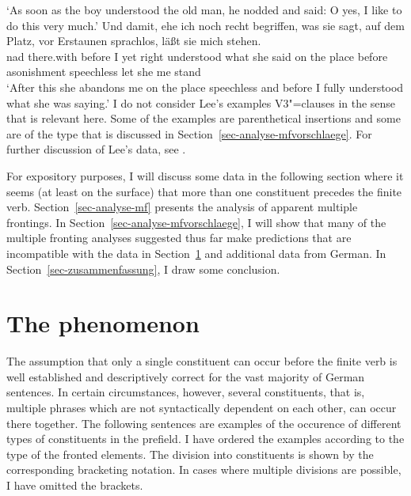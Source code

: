 \glt `As soon as the boy understood the old man, he nodded and said: O yes, I like to do this very much.'
\ex 
\gll Und damit, ehe ich noch recht begriffen, was sie sagt, auf dem Platz, vor Erstaunen sprachlos, läßt sie mich stehen.\footnotemark\\
     nad there.with before I yet right understood what she said on the place before asonishment
     speechless let she me stand\\
\glt `After this she abandons me on the place speechless and before I fully understood what she was saying.'
\zl
I do not consider Lee's examples V3"=clauses in the sense that is relevant here. Some of the
examples are parenthetical insertions and some are of the type that is discussed in
Section~\ref{sec-analyse-mfvorschlaege}. For further discussion of Lee's data, see .



For expository purposes, I will discuss some data in the following section where it seems (at least on the surface) that more
than one constituent precedes the finite verb. Section~\ref{sec-analyse-mf} presents the analysis of
apparent multiple frontings. In Section~\ref{sec-analyse-mfvorschlaege}, I will show that many of the multiple fronting analyses suggested thus far make predictions
that are incompatible with the data in Section~\ref{sec-phenomenon-mult-front} and additional data from German.
In Section~\ref{sec-zusammenfassung}, I draw some conclusion.


\section{The phenomenon}
\label{sec-phenomenon-mult-front}

The assumption that only a single constituent can occur before the finite verb is well established and
descriptively correct for the vast majority of German sentences. In certain circumstances, however, several
constituents, that is, multiple phrases which are not syntactically dependent on each other, can occur there
together. The following sentences are examples of the occurence of different types of constituents in the prefield.
I have ordered the examples according to the type of the fronted elements. The division into constituents is shown
by the corresponding bracketing notation. In cases where multiple divisions are possible, I have omitted the brackets.

